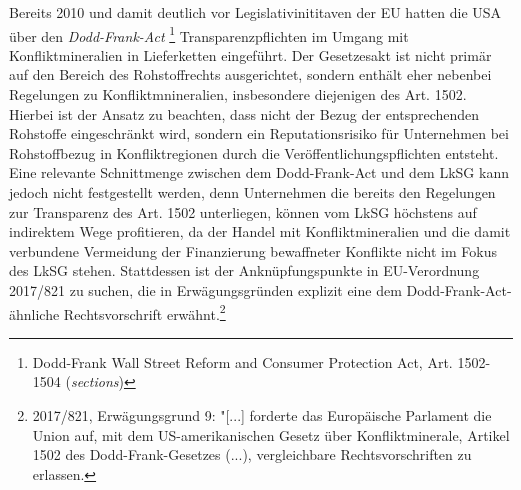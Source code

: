 \documentclass[12pt,a4paper,oneside]{book} %
\begin{document}
	Bereits 2010 und damit deutlich vor Legislativinititaven der EU hatten die USA über den \textit{Dodd-Frank-Act} \footnote{Dodd-Frank Wall Street Reform and Consumer Protection Act, Art. 1502-1504 (\textit{sections})} Transparenzpflichten im Umgang mit Konfliktmineralien in Lieferketten eingeführt. Der Gesetzesakt ist nicht primär auf den Bereich des Rohstoffrechts ausgerichtet, sondern enthält eher nebenbei Regelungen zu Konfliktmnineralien, insbesondere diejenigen des Art. 1502.  Hierbei ist der Ansatz zu beachten, dass nicht der Bezug der entsprechenden Rohstoffe eingeschränkt wird, sondern ein Reputationsrisiko für Unternehmen bei Rohstoffbezug in Konfliktregionen durch die Veröffentlichungspflichten entsteht.\autocite[Rn. 415]{ruttloff_lieferkettensorgfaltspflichtengesetz_2022} Eine relevante Schnittmenge zwischen dem Dodd-Frank-Act und dem LkSG kann jedoch nicht festgestellt werden, denn Unternehmen die bereits den Regelungen zur Transparenz des Art. 1502 unterliegen, können vom LkSG höchstens auf indirektem Wege profitieren, da der Handel mit Konfliktmineralien und die damit verbundene Vermeidung der Finanzierung bewaffneter Konflikte nicht im Fokus des LkSG stehen.\autocite[Rn 423]{ruttloff_lieferkettensorgfaltspflichtengesetz_2022} Stattdessen ist der Anknüpfungspunkte in EU-Verordnung 2017/821 zu suchen, die in Erwägungsgründen explizit eine dem Dodd-Frank-Act-ähnliche Rechtsvorschrift erwähnt.\footnote{2017/821, Erwägungsgrund 9: "[...] forderte das Europäische Parlament die Union auf, mit dem US-amerikanischen Gesetz über Konfliktminerale, Artikel 1502 des Dodd-Frank-Gesetzes (...), vergleichbare Rechtsvorschriften zu erlassen.} 
	
	
	
\end{document}
